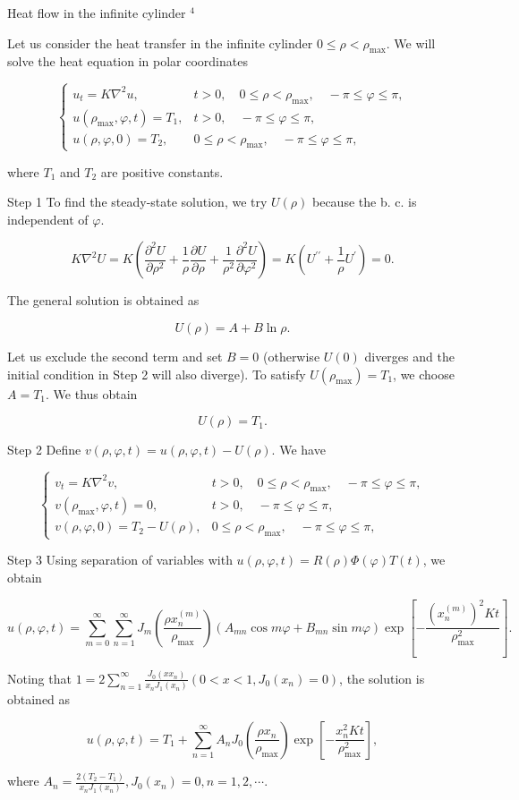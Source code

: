 Heat flow in the infinite cylinder ${ }^4$

Let us consider the heat transfer in the infinite cylinder $0 \leq \rho<\rho_{\max }$. We will solve the heat equation in polar coordinates

$$
\left\{\begin{aligned}
u_t=K \nabla^2 u, & t>0, \quad 0 \leq \rho<\rho_{\max }, \quad-\pi \leq \varphi \leq \pi, \\
u\left(\rho_{\max }, \varphi, t\right)=T_1, & t>0, \quad-\pi \leq \varphi \leq \pi, \\
u(\rho, \varphi, 0)=T_2, & 0 \leq \rho<\rho_{\max }, \quad-\pi \leq \varphi \leq \pi,
\end{aligned}\right.
$$

where $T_1$ and $T_2$ are positive constants.

Step 1
To find the steady-state solution, we try $U(\rho)$ because the b. c. is independent of $\varphi$.

$$
K \nabla^2 U=K\left(\frac{\partial^2 U}{\partial \rho^2}+\frac{1}{\rho} \frac{\partial U}{\partial \rho}+\frac{1}{\rho^2} \frac{\partial^2 U}{\partial \varphi^2}\right)=K\left(U^{\prime \prime}+\frac{1}{\rho} U^{\prime}\right)=0 .
$$


The general solution is obtained as

$$
U(\rho)=A+B \ln \rho .
$$


Let us exclude the second term and set $B=0$ (otherwise $U(0)$ diverges and the initial condition in Step 2 will also diverge). To satisfy $U\left(\rho_{\max }\right)=T_1$, we choose $A=T_1$. We thus obtain

$$
U(\rho)=T_1 .
$$

Step 2
Define $v(\rho, \varphi, t)=u(\rho, \varphi, t)-U(\rho)$. We have

$$
\left\{\begin{aligned}
v_t=K \nabla^2 v, & t>0, \quad 0 \leq \rho<\rho_{\max }, \quad-\pi \leq \varphi \leq \pi, \\
v\left(\rho_{\max }, \varphi, t\right)=0, & t>0, \quad-\pi \leq \varphi \leq \pi, \\
v(\rho, \varphi, 0)=T_2-U(\rho), & 0 \leq \rho<\rho_{\max }, \quad-\pi \leq \varphi \leq \pi,
\end{aligned}\right.
$$


Step 3
Using separation of variables with $u(\rho, \varphi, t)=R(\rho) \Phi(\varphi) T(t)$, we obtain

$$
u(\rho, \varphi, t)=\sum_{m=0}^{\infty} \sum_{n=1}^{\infty} J_m\left(\frac{\rho x_n^{(m)}}{\rho_{\max }}\right)\left(A_{m n} \cos m \varphi+B_{m n} \sin m \varphi\right) \exp \left[-\frac{\left(x_n^{(m)}\right)^2 K t}{\rho_{\max }^2}\right] .
$$


Noting that $1=2 \sum_{n=1}^{\infty} \frac{J_0\left(x x_n\right)}{x_n J_1\left(x_n\right)}\left(0<x<1, J_0\left(x_n\right)=0\right)$, the solution is obtained as

$$
u(\rho, \varphi, t)=T_1+\sum_{n=1}^{\infty} A_n J_0\left(\frac{\rho x_n}{\rho_{\max }}\right) \exp \left[-\frac{x_n^2 K t}{\rho_{\max }^2}\right],
$$

where $A_n=\frac{2\left(T_2-T_1\right)}{x_n J_1\left(x_n\right)}, J_0\left(x_n\right)=0, n=1,2, \cdots$.
